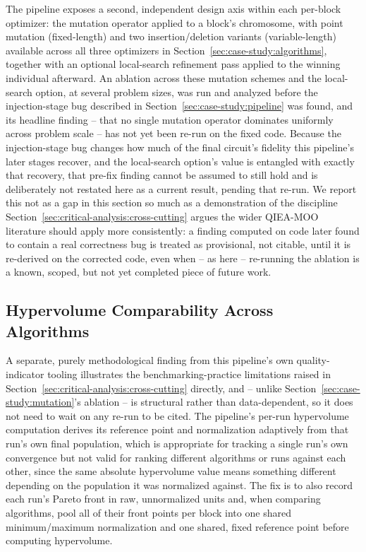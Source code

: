 The pipeline exposes a second, independent design axis within each
per-block optimizer: the mutation operator applied to a block's
chromosome, with point mutation (fixed-length) and two
insertion/deletion variants (variable-length) available across all
three optimizers in Section~\ref{sec:case-study:algorithms}, together
with an optional local-search refinement pass applied to the winning
individual afterward. An ablation across these mutation schemes and the
local-search option, at several problem sizes, was run and analyzed
before the injection-stage bug described in
Section~\ref{sec:case-study:pipeline} was found, and its headline
finding -- that no single mutation operator dominates uniformly across
problem scale -- has not yet been re-run on the fixed code. Because the
injection-stage bug changes how much of the final circuit's fidelity
this pipeline's later stages recover, and the local-search option's
value is entangled with exactly that recovery, that pre-fix finding
cannot be assumed to still hold and is deliberately not restated here as
a current result, pending that re-run. We report this not as a gap in
this section so much as a demonstration of the discipline
Section~\ref{sec:critical-analysis:cross-cutting} argues the wider
QIEA-MOO literature should apply more consistently: a finding computed
on code later found to contain a real correctness bug is treated as
provisional, not citable, until it is re-derived on the corrected code,
even when -- as here -- re-running the ablation is a known, scoped, but
not yet completed piece of future work.

\subsection{Hypervolume Comparability Across Algorithms}
\label{sec:case-study:hypervolume}

A separate, purely methodological finding from this pipeline's own
quality-indicator tooling illustrates the benchmarking-practice
limitations raised in Section~\ref{sec:critical-analysis:cross-cutting}
directly, and -- unlike Section~\ref{sec:case-study:mutation}'s
ablation -- is structural rather than data-dependent, so it does not
need to wait on any re-run to be cited. The pipeline's per-run
hypervolume computation derives its reference point and normalization
adaptively from that run's own final population, which is appropriate
for tracking a single run's own convergence but not valid for ranking
different algorithms or runs against each other, since the same
absolute hypervolume value means something different depending on the
population it was normalized against. The fix is to also record each
run's Pareto front in raw, unnormalized units and, when comparing
algorithms, pool all of their front points per block into one shared
minimum/maximum normalization and one shared, fixed reference point
before computing hypervolume.

